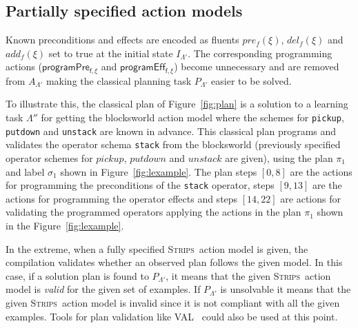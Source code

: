 \documentclass[letterpaper]{article} %
\newcommand{\strips}{\textsc{Strips}}     %
\begin{document}
\subsection{Partially specified action models}
Known preconditions and effects are encoded as fluents $pre_f(\xi)$, $del_f(\xi)$ and $add_f(\xi)$ set to true at the initial state $I_{\Lambda'}$. The corresponding programming actions ($\mathsf{programPre_{f,\xi}}$ and $\mathsf{programEff_{f,\xi}}$) become unnecessary and are removed from $A_{\Lambda'}$ making the classical planning task $P_{\Lambda'}$ easier to be solved.

To illustrate this, the classical plan of Figure~\ref{fig:plan} is a solution to a learning task $\Lambda''$ for getting the blocksworld action model where the schemes for {\tt\small pickup}, {\tt\small putdown} and {\tt\small unstack} are known in advance. This classical plan programs and validates the operator schema {\tt\small stack} from the blocksworld (previously specified operator schemes for $pickup$, $putdown$ and $unstack$ are given), using the plan $\pi_1$ and label $\sigma_1$ shown in Figure~\ref{fig:lexample}. The plan steps $[0,8]$ are the actions for programming the preconditions of the {\tt\small stack} operator, steps $[9,13]$ are the actions for programming the operator effects and steps $[14,22]$ are actions for validating the programmed operators applying the actions in the plan $\pi_1$ shown in the Figure~\ref{fig:lexample}. 

In the extreme, when a fully specified \strips\ action model is given, the compilation validates whether an observed plan follows the given model. In this case, if a solution plan is found to $P_{\Lambda'}$, it means that the given \strips\ action model is {\em valid} for the given set of examples. If $P_{\Lambda'}$ is unsolvable it means that the given \strips\ action model is invalid since it is not compliant with all the given examples. Tools for plan validation like VAL~\cite{howey2004val} could also be used at this point.
\end{document}
